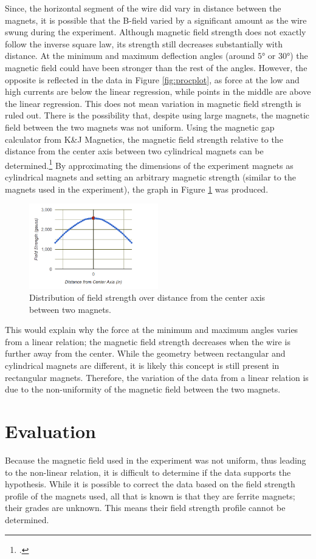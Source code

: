 Since, the horizontal segment of the wire did vary in distance between the magnets, it is possible that the B-field varied by a significant amount as the wire swung during the experiment.
Although magnetic field strength does not exactly follow the inverse square law, its strength still decreases substantially with distance.
At the minimum and maximum deflection angles (around $5\si{\degree}$ or $30\si{\degree}$) the magnetic field could have been stronger than the rest of the angles.
However, the opposite is reflected in the data in Figure \ref{fig:procplot}, as force at the low and high currents are below the linear regression, while points in the middle are above the linear regression.
This does not mean variation in magnetic field strength is ruled out.
There is the possibility that, despite using large magnets, the magnetic field between the two magnets was not uniform.
Using the magnetic gap calculator from K{\&}J Magnetics, the magnetic field strength relative to the distance from the center axis between two cylindrical magnets can be determined.\footcite{kjgap}
By approximating the dimensions of the experiment magnets as cylindrical magnets and setting an arbitrary magnetic strength (similar to the magnets used in the experiment), the graph in Figure \ref{fig:gaps} was produced.
\begin{figure}[H]
	\centering
	\includegraphics[width=0.5\textwidth]{figures/gapplot.PNG}
	\caption{Distribution of field strength over distance from the center axis between two magnets.}
	\label{fig:gaps}
	\vspace{-1em}
\end{figure}
This would explain why the force at the minimum and maximum angles varies from a linear relation; the magnetic field strength decreases when the wire is further away from the center.
While the geometry between rectangular and cylindrical magnets are different, it is likely this concept is still present in rectangular magnets.
Therefore, the variation of the data from a linear relation is due to the non-uniformity of the magnetic field between the two magnets.

\section*{Evaluation}

Because the magnetic field used in the experiment was not uniform, thus leading to the non-linear relation, it is difficult to determine if the data supports the hypothesis.
While it is possible to correct the data based on the field strength profile of the magnets used, all that is known is that they are ferrite magnets; their grades are unknown.
This means their field strength profile cannot be determined.
